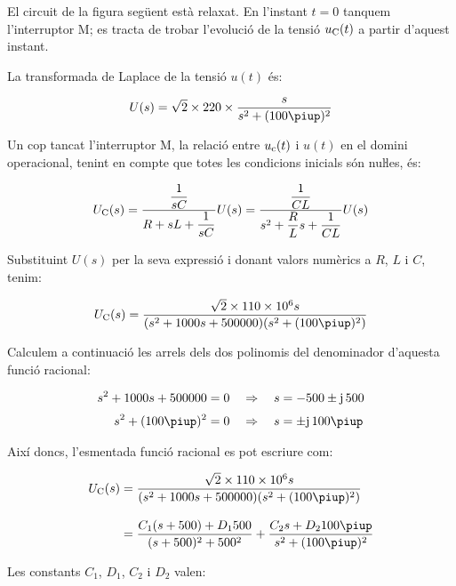\begin{exemple}[\CircuitLaplaceNul{}]
	\addcontentsxms{\CircuitLaplaceNul}
    El circuit de la figura següent està relaxat. En l'instant $t=0$
    tanquem l'interruptor M; es tracta de trobar l'evolució de la tensió
    $u_\mathrm{C}(t)$ a partir d'aquest instant.

    \begin{center}
        
    \end{center}

    La transformada de Laplace de la tensió $u(t)$ és:

    \[
        U(s) = \sqrt{2}\times 220\times \frac{s}{s^2 + (100\piup)^2}
    \]

    Un cop tancat l'interruptor M, la relació entre $u_\mathrm{c}(t)$ i
    $u(t)$ en el domini operacional, tenint en compte que totes les
    condicions inicials són nuŀles, és:

    \[
        U_\mathrm{C}(s) = \frac{\dfrac{1}{sC}}{R+ sL +\dfrac{1}{sC}} U(s)=
        \frac{\dfrac{1}{CL}}{s^2 + \dfrac{R}{L}s +\dfrac{1}{CL}} U(s)
    \]

    Substituint $U(s)$ per la seva expressió i donant valors numèrics a
    $R$, $L$ i $C$, tenim:

    \[
        U\ped{C}(s) = \frac{\sqrt{2}\times 110\times 10^6 s}{(s^2 + 1000 s + 500000)(s^2 + (100\piup)^2)}
    \]

    Calculem a continuació les arrels dels dos polinomis  del
    denominador d'aquesta funció racional:

    \begin{align*}
        s^2 + 1000 s + 500000 &= 0 \quad\Rightarrow\quad s = -500
        \pm\ju\,500 \\[0.5ex]
        s^2 + (100\piup)^2 &= 0 \quad\Rightarrow\quad s = \pm\ju\,100\piup
    \end{align*}

    Així doncs, l'esmentada funció racional es pot escriure com:

    \[\begin{split}
    U\ped{C}(s) &= \frac{\sqrt{2}\times 110\times 10^6 s}{(s^2 + 1000 s +
    500000)(s^2 + (100\piup)^2)}   \\[2ex] &= \frac{C_1 (s+500) + D_1
    500}{(s+500)^2+500^2} + \frac{C_2 s + D_2 100 \piup}{s^2 +(100\piup)^2}
    \end{split}\]

    Les constants $C_1$, $D_1$,  $C_2$ i $D_2$ valen:


\end{exemple}
